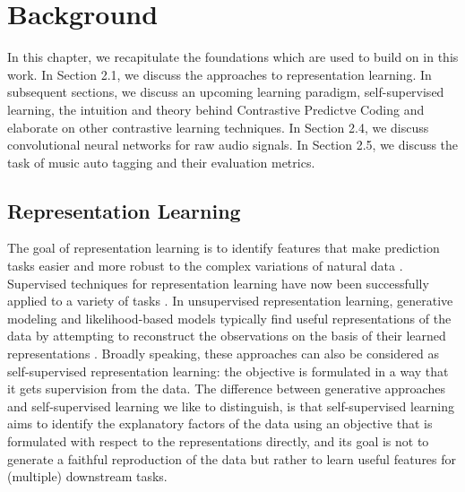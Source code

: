 
\chapter{Background}\label{sec:background}
In this chapter, we recapitulate the foundations which are used to build on in this work. In Section 2.1, we discuss the approaches to representation learning. In subsequent sections, we discuss an upcoming learning paradigm, self-supervised learning, the intuition and theory behind Contrastive Predictve Coding \cite{oord_representation_2019} and elaborate on other contrastive learning techniques. In Section 2.4, we discuss convolutional neural networks for raw audio signals. In Section 2.5, we discuss the task of music auto tagging and their evaluation metrics.

\section{Representation Learning}

The goal of representation learning is to identify features that make  prediction tasks easier and more robust to the complex variations of natural data \cite{bengio2013representation}. Supervised techniques for representation learning have now been successfully applied to a variety of tasks \cite{korzeniowski_fully_2016, chen_harmony_2019, korzeniowski_end--end_2017, bock_joint_2016, pons_end--end_2017, van_den_oord_deep_2013}. 
In unsupervised representation learning, generative modeling and likelihood-based models typically find useful representations of the data by attempting to reconstruct the observations on the basis of their learned representations \cite{goodfellow2014generative, unsupervised_gan}. Broadly speaking, these approaches can also be considered as self-supervised representation learning: the objective is formulated in a way that it gets supervision from the data. The difference between generative approaches and self-supervised learning we like to distinguish, is that self-supervised learning aims to identify the explanatory factors of the data using an objective that is formulated with respect to the representations directly, and its goal is not to generate a faithful reproduction of the data but rather to learn useful features for (multiple) downstream tasks. \\

